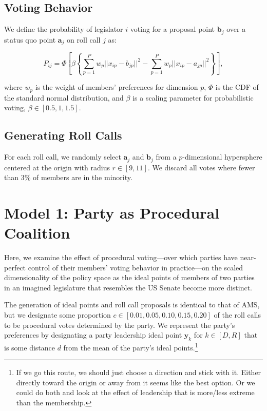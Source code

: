 \documentclass[12pt]{article}
\begin{document}
\subsection*{Voting Behavior}

We define the probability of legislator $i$ voting for a proposal point $\boldsymbol{b}_j$ over a status quo point $\boldsymbol{a}_j$ on roll call $j$ as:

\begin{equation}
    P_{ij} = \Phi \left[ \beta \left\lbrace \sum_{p=1}^{P}{w_p||x_{ip} - b_{jp}||^2} - \sum_{p=1}^{P}{w_p||x_{ip} - a_{jp}||^2} \right\rbrace \right],
\end{equation}

\vspace{2mm}
\noindent
where $w_p$ is the weight of members' preferences for dimension $p$, $\Phi$ is the CDF of the standard normal distribution, and $\beta$ is a scaling parameter for probabilistic voting, $\beta \in [0.5, 1, 1.5]$.

\subsection*{Generating Roll Calls}

For each roll call, we randomly select $\boldsymbol{a}_j$ and $\boldsymbol{b}_j$ from a $p$-dimensional hypersphere centered at the origin with radius $r \in [9, 11]$. We discard all votes where fewer than 3\% of members are in the minority.

\section*{Model 1: Party as Procedural Coalition}

Here, we examine the effect of procedural voting---over which parties have near-perfect control of their members' voting behavior in practice---on the scaled dimensionality of the policy space as the ideal points of members of two parties in an imagined legislature that resembles the US Senate become more distinct.

The generation of ideal points and roll call proposals is identical to that of AMS, but we designate some proportion $c \in [0.01, 0.05, 0.10, 0.15, 0.20]$ of the roll calls to be procedural votes determined by the party. We represent the party's preferences by designating a party leadership ideal point $\boldsymbol{y}_k$ for $k \in [D, R]$ that is some distance $d$ from the mean of the party's ideal points.\footnote{If we go this route, we should just choose a direction and stick with it. Either directly toward the origin or away from it seems like the best option. Or we could do both and look at the effect of leadership that is more/less extreme than the membership.}
\end{document}
